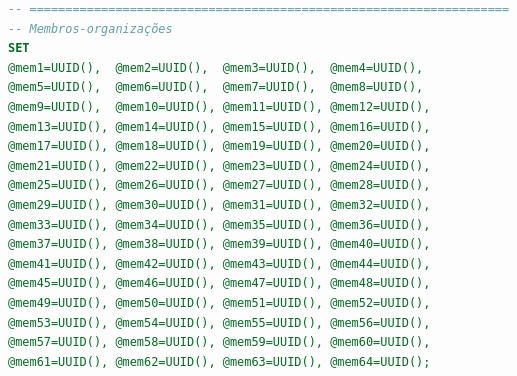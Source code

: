 \documentclass[12pt,a4paper]{report}
\begin{document}
\begin{lstlisting}[language=SQL, caption=population.sql]
-- ===================================================================
-- Membros-organizações
SET
@mem1=UUID(),  @mem2=UUID(),  @mem3=UUID(),  @mem4=UUID(),
@mem5=UUID(),  @mem6=UUID(),  @mem7=UUID(),  @mem8=UUID(),
@mem9=UUID(),  @mem10=UUID(), @mem11=UUID(), @mem12=UUID(),
@mem13=UUID(), @mem14=UUID(), @mem15=UUID(), @mem16=UUID(),
@mem17=UUID(), @mem18=UUID(), @mem19=UUID(), @mem20=UUID(),
@mem21=UUID(), @mem22=UUID(), @mem23=UUID(), @mem24=UUID(),
@mem25=UUID(), @mem26=UUID(), @mem27=UUID(), @mem28=UUID(),
@mem29=UUID(), @mem30=UUID(), @mem31=UUID(), @mem32=UUID(),
@mem33=UUID(), @mem34=UUID(), @mem35=UUID(), @mem36=UUID(),
@mem37=UUID(), @mem38=UUID(), @mem39=UUID(), @mem40=UUID(),
@mem41=UUID(), @mem42=UUID(), @mem43=UUID(), @mem44=UUID(),
@mem45=UUID(), @mem46=UUID(), @mem47=UUID(), @mem48=UUID(),
@mem49=UUID(), @mem50=UUID(), @mem51=UUID(), @mem52=UUID(),
@mem53=UUID(), @mem54=UUID(), @mem55=UUID(), @mem56=UUID(),
@mem57=UUID(), @mem58=UUID(), @mem59=UUID(), @mem60=UUID(),
@mem61=UUID(), @mem62=UUID(), @mem63=UUID(), @mem64=UUID();


\end{lstlisting}
\end{document}
